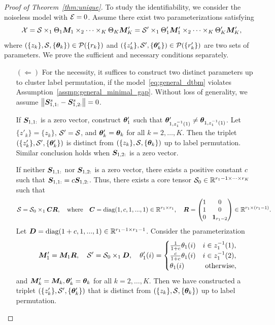 \documentclass[lettersize,onecolumn,journal]{IEEEtran}
\theoremstyle{definition}
\theoremstyle{definition}
\newcommand{\of}[1]{\left(#1\right)}
\begin{document}
\begin{proof}[Proof of Theorem~\ref{thm:unique}] 

To study the identifiability, we consider the noiseless model with $\mathcal{E} = 0$. Assume there exist two parameterizations satisfying
\begin{equation}\label{eq:another}
    \tX=\tS\times_1\Theta_1 \mM_1 \times_2 \cdots \times_K \Theta_K \mM'_K=\tS'\times_1\Theta'_1 \mM'_1 \times_2 \cdots \times_K \Theta'_K \mM'_K,
\end{equation}
where $\of{ \{z_k\}, \tS, \{ \mtheta_k \} } \in \tP(\{r_k\})$ and $\of{ \{z'_k\}, \tS', \{ \mtheta'_k \} } \in \tP(\{r_k'\})$ are two sets of parameters. We prove the sufficient and necessary conditions separately.

\begin{enumerate}[wide]
    \item[$(\Leftarrow)$] For the necessity, it suffices to construct two distinct parameters up to cluster label permutation, if the model~\eqref{eq:general_dtbm} violates Assumption~\ref{assmp:general_minimal_gap}. Without loss of generality, we assume $\left\lVert \bm S_{1,1:}^s - \bm S_{1,2:}^s \right\rVert = 0$.

 If $\bm S_{1,1:}$ is a zero vector, construct $\boldsymbol{\theta}_1'$ such that $\boldsymbol{\theta}'_{1,z_1^{-1}(1)} \neq \boldsymbol{\theta}_{1,z_1^{-1}(1)}$. Let $\{z'_k\} = \{z_k\}$, $\mathcal{S}' = \mathcal{S}$, and $\boldsymbol{\theta}'_k = \boldsymbol{\theta}_k$ for all $k = 2, \ldots, K$. Then the triplet $\of{ \{z'_k\}, \tS', \{ \mtheta'_k \} }$ is distinct from $\of{ \{z_k\}, \tS, \{ \mtheta_k \} }$ up to label permutation. Similar conclusion holds when $\bm S_{1,2:}$ is a zero vector. 

If neither $\bm S_{1,1:}$ nor $\bm S_{1,2:}$ is a zero vector, there exists a positive constant $c$ such that $\bm S_{1,1:} = c \bm S_{1,2:}$. Thus, there exists a core tensor $\mathcal{S}_0 \in \mathbb{R}^{r_1 -1 \times \cdots \times r_K}$ such that 
\begin{equation}
    \mathcal{S} = \mathcal{S}_0 \times_1 \bm C \bm{R}, \quad \text{where} \quad \bm C = \text{diag}(1, c, 1,...,1) \in \mathbb{R}^{r_1 \times r_1}, \quad \bm{R} = \begin{pmatrix}
    1& 0\\
    1&0 \\
    0 & \mathbf{1}_{r_1-2}
    \end{pmatrix} \in \mathbb{R}^{r_1 \times (r_1 -1)}.
\end{equation}
Let $\bm{D} = \text{diag}(1+c, 1,...,1) \in \mathbb{R}^{r_1 -1 \times r_1 -1}$. Consider the parameterization
\begin{equation}
    \bm M'_1 = \bm M_1 \bm{R}, \quad \mathcal{S}' = \mathcal{S}_0 \times_1 \bm{D}, \quad \theta'_{1}(i) = \begin{cases}
    \frac{1}{1+c} \theta_{1}(i) & i \in z_{1}^{-1}(1),\\
     \frac{c}{1+c} \theta_{1}(i) & i \in z_{1}^{-1}(2),\\
     \theta_{1}(i) & \text{ otherwise},
    \end{cases}
\end{equation}
and $\bm M'_k = \bm M_k, \boldsymbol{\theta}'_k = \boldsymbol{\theta}_k$ for all $k = 2, \ldots, K$. Then we have constructed a
triplet $\of{ \{z'_k\}, \tS', \{ \mtheta'_k \} }$ that is distinct from $\of{ \{z_k\}, \tS, \{ \mtheta_k \} }$ up to label permutation. 


\end{enumerate}
\end{proof}
\end{document}
